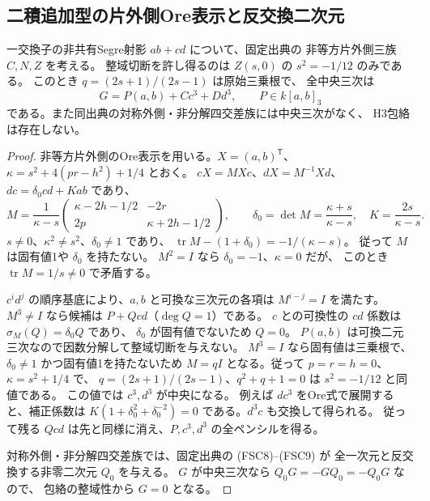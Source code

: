 \subsection{二積追加型の片外側Ore表示と反交換二次元}
\label{subsec:cubic-CY-one-segre-double-split}

\begin{proposition}\label{prop:cubic-CY-one-segre-double-split-outer-center}
一交換子の非共有Segre射影 $ab+cd$ について、固定出典\cite{AS4CYpinned}の
非等方片外側三族 $C,N,Z$ を考える。
整域切断を許し得るのは $Z(s,0)$ の $s^2=-1/12$ のみである。
このとき $q=(2s+1)/(2s-1)$ は原始三乗根で、
全中央三次は
\[
 G=P(a,b)+C c^3+D d^3,\qquad P\in k[a,b]_3
\]
である。また同出典の対称外側・非分解四交差族には中央三次がなく、
H3包絡は存在しない。
\end{proposition}
\begin{proof}
非等方片外側のOre表示を用いる。$X=(a,b)^{\mathsf T}$、
$\kappa=s^2+4(pr-h^2)+1/4$ とおく。
$cX=MXc$、$dX=M^{-1}Xd$、$dc=\delta_0 cd+Kab$ であり、
\[
 M=\frac{1}{\kappa-s}
 \begin{pmatrix}\kappa-2h-1/2&-2r\\2p&\kappa+2h-1/2\end{pmatrix},
 \qquad
 \delta_0=\det M=\frac{\kappa+s}{\kappa-s},\quad
 K=\frac{2s}{\kappa-s}.
\]
$s\ne0$、$\kappa^2\ne s^2$、$\delta_0\ne1$ であり、
$\operatorname{tr}M-(1+\delta_0)=-1/(\kappa-s)$。
従って $M$ は固有値1や $\delta_0$ を持たない。
$M^2=I$ なら $\delta_0=-1$、$\kappa=0$ だが、
このとき $\operatorname{tr}M=1/s\ne0$ で矛盾する。

$c^i d^j$ の順序基底により、$a,b$ と可換な三次元の各項は
$M^{i-j}=I$ を満たす。
$M^3\ne I$ なら候補は $P+Qcd$（$\deg Q=1$）である。
$c$ との可換性の $cd$ 係数は $\sigma_M(Q)=\delta_0 Q$ であり、
$\delta_0$ が固有値でないため $Q=0$。
$P(a,b)$ は可換二元三次なので因数分解して整域切断を与えない。
$M^3=I$ なら固有値は三乗根で、$\delta_0\ne1$ かつ固有値1を持たないため
$M=qI$ となる。従って $p=r=h=0$、$\kappa=s^2+1/4$ で、
$q=(2s+1)/(2s-1)$、$q^2+q+1=0$ は $s^2=-1/12$ と同値である。
この値では $c^3,d^3$ が中央になる。
例えば $dc^3$ をOre式で展開すると、補正係数は
$K(1+\delta_0^2+\delta_0^{-2})=0$ である。$d^3c$ も交換して得られる。
従って残る $Qcd$ は先と同様に消え、$P,c^3,d^3$ の全ペンシルを得る。

対称外側・非分解四交差族では、固定出典の (FSC8)--(FSC9) が
全一次元と反交換する非零二次元 $Q_0$ を与える。
$G$ が中央三次なら $Q_0G=-GQ_0= -Q_0G$ なので、
包絡の整域性から $G=0$ となる。
\end{proof}

